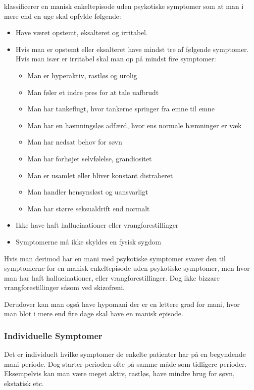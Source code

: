 \citet{misc:netpsykmani} klassificerer en manisk enkeltepisode uden psykotiske symptomer som at man i mere end en uge skal opfylde følgende:
\begin{itemize}
	\item Have været opstemt, eksalteret og irritabel.
	\item Hvis man er opstemt eller eksalteret have mindst tre af følgende symptomer. Hvis man især er irritabel skal man op på mindst fire symptomer:
	\begin{itemize}
		\item Man er hyperaktiv, rastløs og urolig
		\item Man føler et indre pres for at tale uafbrudt
		\item Man har tankeflugt, hvor tankerne springer fra emne til emne
		\item Man har en hæmningsløs adfærd, hvor ens normale hæmninger er væk
		\item Man har nedsat behov for søvn
		\item Man har forhøjet selvfølelse, grandiositet
		\item Man er usamlet eller bliver konstant distraheret
		\item Man handler hensynsløst og uansvarligt
		\item Man har større seksualdrift end normalt
	\end{itemize}
	\item Ikke have haft hallucinationer eller vrangforestillinger
	\item Symptomerne må ikke skyldes en fysisk sygdom
\end{itemize}
Hvis man derimod har en mani med psykotiske symptomer svarer den til symptomerne for en manisk enkeltepisode uden psykotiske symptomer, men hvor man har haft hallucinationer, eller vrangforestillinger. Dog ikke bizzare vrangforestillinger såsom ved skizofreni.

Derudover kan man også have hypomani der er en lettere grad for mani, hvor man blot i mere end fire dage skal have en manisk episode.

\subsubsection{Individuelle Symptomer}
Det er individuelt hvilke symptomer de enkelte patienter har på en begyndende mani periode.
Dog starter perioden ofte på samme måde som tidligere perioder.
Eksempelvis kan man være meget aktiv, rastløs, have mindre brug for søvn, ekstatisk etc.

